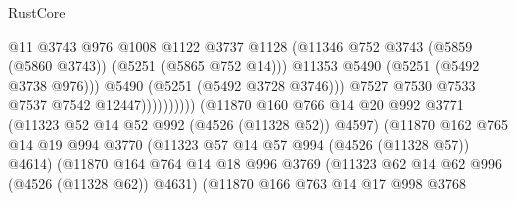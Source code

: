 \begin{lexlean}{RustCore}
\begin{coremodule}
                                                  @11
                                                  @3743
                                                  @976
                                                  @1008
                                                  @1122
                                                  @3737
                                                  @1128
                                                  (@11346
                                                    @752
                                                    @3743
                                                    (@5859 (@5860 @3743))
                                                    (@5251 (@5865 @752 @14)))
                                                  @11353
                                                  @5490
                                                  (@5251 (@5492 @3738 @976)))
                                                @5490
                                                (@5251 (@5492 @3728 @3746)))
                                              @7527
                                              @7530
                                              @7533
                                              @7537
                                              @7542
                                              @12447))))))))))
                          (@11870
                            @160
                            @766
                            @14
                            @20
                            @992
                            @3771
                            (@11323 @52 @14 @52 @992 (@4526 (@11328 @52)) @4597)
                            (@11870
                              @162
                              @765
                              @14
                              @19
                              @994
                              @3770
                              (@11323 @57 @14 @57 @994 (@4526 (@11328 @57)) @4614)
                              (@11870
                                @164
                                @764
                                @14
                                @18
                                @996
                                @3769
                                (@11323 @62 @14 @62 @996 (@4526 (@11328 @62)) @4631)
                                (@11870
                                  @166
                                  @763
                                  @14
                                  @17
                                  @998
                                  @3768

\end{coremodule}
\end{lexlean}
